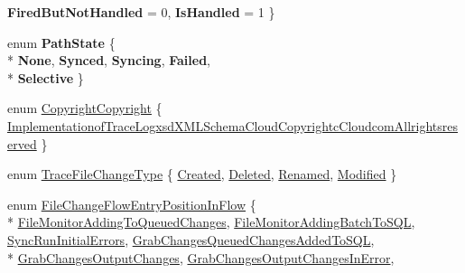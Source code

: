 \begin{DoxyCompactItemize}
{\bfseries Fired\-But\-Not\-Handled} = 0, 
{\bfseries Is\-Handled} = 1
 \}
\item 
enum {\bfseries Path\-State} \{ \\*
{\bfseries None}, 
{\bfseries Synced}, 
{\bfseries Syncing}, 
{\bfseries Failed}, 
\\*
{\bfseries Selective}
 \}
\item 
enum \hyperlink{namespace_cloud_api_public_1_1_static_a889ed6895b377efd7091a65ddb8cb3f0}{Copyright\-Copyright} \{ \hyperlink{namespace_cloud_api_public_1_1_static_a889ed6895b377efd7091a65ddb8cb3f0}{Implementationof\-Trace\-Logxsd\-X\-M\-L\-Schema\-Cloud\-Copyrightc\-Cloudcom\-Allrightsreserved}
 \}
\begin{DoxyCompactList}\small\item\em \end{DoxyCompactList}\item 
enum \hyperlink{namespace_cloud_api_public_1_1_static_aadccab0d764f187bdd87a34e98676034}{Trace\-File\-Change\-Type} \{ \hyperlink{namespace_cloud_api_public_1_1_static_aadccab0d764f187bdd87a34e98676034}{Created}, 
\hyperlink{namespace_cloud_api_public_1_1_static_aadccab0d764f187bdd87a34e98676034}{Deleted}, 
\hyperlink{namespace_cloud_api_public_1_1_static_aadccab0d764f187bdd87a34e98676034}{Renamed}, 
\hyperlink{namespace_cloud_api_public_1_1_static_aadccab0d764f187bdd87a34e98676034}{Modified}
 \}
\begin{DoxyCompactList}\small\item\em \end{DoxyCompactList}\item 
enum \hyperlink{namespace_cloud_api_public_1_1_static_a9082ca8fb56ff22723a53cd835e02451}{File\-Change\-Flow\-Entry\-Position\-In\-Flow} \{ \\*
\hyperlink{namespace_cloud_api_public_1_1_static_a9082ca8fb56ff22723a53cd835e02451}{File\-Monitor\-Adding\-To\-Queued\-Changes}, 
\hyperlink{namespace_cloud_api_public_1_1_static_a9082ca8fb56ff22723a53cd835e02451}{File\-Monitor\-Adding\-Batch\-To\-S\-Q\-L}, 
\hyperlink{namespace_cloud_api_public_1_1_static_a9082ca8fb56ff22723a53cd835e02451}{Sync\-Run\-Initial\-Errors}, 
\hyperlink{namespace_cloud_api_public_1_1_static_a9082ca8fb56ff22723a53cd835e02451}{Grab\-Changes\-Queued\-Changes\-Added\-To\-S\-Q\-L}, 
\\*
\hyperlink{namespace_cloud_api_public_1_1_static_a9082ca8fb56ff22723a53cd835e02451}{Grab\-Changes\-Output\-Changes}, 
\hyperlink{namespace_cloud_api_public_1_1_static_a9082ca8fb56ff22723a53cd835e02451}{Grab\-Changes\-Output\-Changes\-In\-Error}, 

\end{DoxyCompactItemize}
